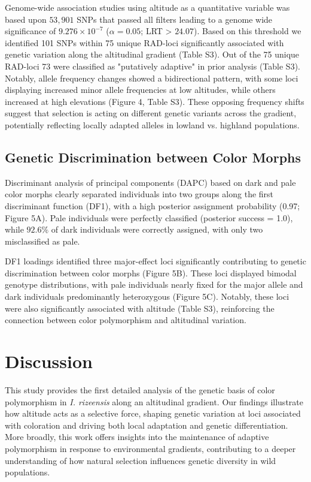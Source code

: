 \documentclass[9pt,a4paper,twoside]{rho-class/rho}
\begin{document}
        Genome-wide association studies using altitude as a quantitative variable was based upon $53,901$ SNPs that passed all filters leading to a genome wide significance of $9.276\times10^{-7}$ ($\alpha = 0.05$; LRT > $24.07$). Based on this threshold we identified 101 SNPs within 75 unique RAD-loci significantly associated with genetic variation along the altitudinal gradient (Table S3). Out of the 75 unique RAD-loci 73 were classified as "putatively adaptive" in prior analysis (Table S3). Notably, allele frequency changes showed a bidirectional pattern, with some loci displaying increased minor allele frequencies at low altitudes, while others increased at high elevations (Figure 4, Table S3). These opposing frequency shifts suggest that selection is acting on different genetic variants across the gradient, potentially reflecting locally adapted alleles in lowland vs. highland populations.
        
    \subsection{Genetic Discrimination between Color Morphs}

        Discriminant analysis of principal components (DAPC) based on dark and pale color morphs clearly separated individuals into two groups along the first discriminant function (DF1), with a high posterior assignment probability (0.97; Figure 5A). Pale individuals were perfectly classified (posterior success = 1.0), while $92.6\%$ of dark individuals were correctly assigned, with only two misclassified as pale.
   
        DF1 loadings identified three major-effect loci significantly contributing to genetic discrimination between color morphs (Figure 5B). These loci displayed bimodal genotype distributions, with pale individuals nearly fixed for the major allele and dark individuals predominantly heterozygous (Figure 5C). Notably, these loci were also significantly associated with altitude (Table S3), reinforcing the connection between color polymorphism and altitudinal variation.


\section{Discussion}

This study provides the first detailed analysis of the genetic basis of color polymorphism in \textit{I. rizeensis} along an altitudinal gradient. Our findings illustrate how altitude acts as a selective force, shaping genetic variation at loci associated with coloration and driving both local adaptation and genetic differentiation. More broadly, this work offers insights into the maintenance of adaptive polymorphism in response to environmental gradients, contributing to a deeper understanding of how natural selection influences genetic diversity in wild populations.
\end{document}
